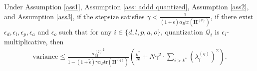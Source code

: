 \documentclass[11pt, letterpaper]{article}
\begin{document}
\begin{lemma}
    \label{variance R2 bound multipicative}
    Under Assumption \ref{ass1}, Assumption \ref{ass: addd quantized}, Assumption \ref{ass2}, and Assumption \ref{ass3}, if the stepsize satisfies $\gamma < \frac{1}{(1+\tilde{\epsilon})\alpha_B\mathrm{tr}(\mathbf{H}^{(q)})}$, if there exist $\epsilon_d,\epsilon_l,\epsilon_p,\epsilon_a$ and $\epsilon_o$ such that for any $i\in \{d,l,p,a,o\}$, quantization $\mathcal{Q}_i$ is $\epsilon_i$-multiplicative, then
    \begin{equation*}
        \begin{aligned}
            \mathrm{variance}\leq  \frac{{\sigma_M^{(q)}}^2}{1-(1+\tilde{\epsilon})\gamma\alpha_B\mathrm{tr}(\mathbf{H}^{(q)})}\left(\frac{k^*}{N}+N\gamma^2\cdot\sum_{i>k^*}(\lambda_i^{(q)})^2\right).
        \end{aligned}
    \end{equation*}
\end{lemma}
\end{document}
